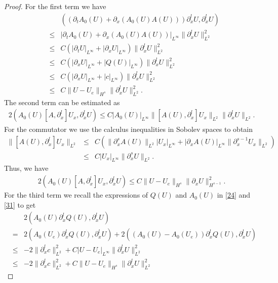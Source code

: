 \documentclass{article}
\theoremstyle{plain}
\begin{document}
\begin{proof}
For the first term we have
\begin{eqnarray}\label{HsEST:1}
  && ((\partial_t A_0(U) + \partial_x (A_0(U)A(U)))\partial^l_x U, \partial^l_x U) \nonumber\\
  &\le&|\partial_t A_0(U) + \partial_x (A_0(U)A(U))|_{L^\infty}\|\partial^l_x U\|_{L^2}^2 \nonumber\\
  &\le& C (|\partial_t U|_{L^\infty}+|\partial_x U|_{L^{\infty}})\|\partial^l_x U\|_{L^2}^2  \\
  &\le& C (|\partial_x U|_{L^\infty}+|Q(U)|_{L^\infty})\|\partial^l_x U\|_{L^2}^2\nonumber\\
  &\le& C (|\partial_x U|_{L^\infty} + |c|_{L^\infty}) \|\partial^l_x U\|_{L^2}^2\nonumber \\
  &\le& C \|U-U_e\|_{H^s} \|\partial^l_x U\|_{L^2}^2. \nonumber
\end{eqnarray}
The second term can be estimated as
\begin{eqnarray*}
  2(A_0(U) [A,\partial^l_x] U_x, \partial^l_x U) \le C |A_0(U)|_{L^\infty} \|[A(U),\partial^l_x] U_x\|_{L^2} \|\partial^l_x U\|_{L^2}.
\end{eqnarray*}
For the commutator we use the calculus inequalities in Sobolev spaces \cite{majda1984compressible} to obtain
\begin{eqnarray*}
  \|[A(U),\partial^l_x] U_x\|_{L^2} &\le& C (\|\partial_x^s A(U)\|_{L^2}|U_x|_{L^\infty} + |\partial_x A(U)|_{L^{\infty}} \|\partial_x^{s-1} U_x\|_{L^2})  \\
  &\le& C|U_x|_{L^\infty} \|\partial_x^s U\|_{L^2}.
\end{eqnarray*}
Thus, we have
\begin{eqnarray}\label{HsEST:2}
  2(A_0(U) [A,\partial_x^l] U_x,\partial^l_x U) \le C \|U-U_e\|_{H^s}\|\partial_x U\|_{H^{s-1}}^2.
\end{eqnarray}
For the third term we recall the expressions of $Q(U)$ and $A_0(U)$ in \eqref{24} and \eqref{31} to get
\begin{eqnarray}\label{HsEST:3}
&& 2(A_0(U)\partial^l_x Q(U),\partial^l_x U) \nonumber \\
&=& 2( A_0(U_e)\partial^l_x Q(U),\partial^l_x U) + 2((A_0(U)-A_0(U_e)) \partial^l_x Q(U),\partial^l_x U) \nonumber \\
&\le&  -2 \|\partial^l_x c\|_{L^2}^2 + C|U-U_e|_{L^\infty} \|\partial^l_x U\|_{L^2}^2 \nonumber \\
&\le& -2 \|\partial^l_x c\|_{L^2}^2 + C\|U-U_e\|_{H^s} \|\partial^l_x U\|_{L^2}^2
\end{eqnarray}


\end{proof}
\end{document}
